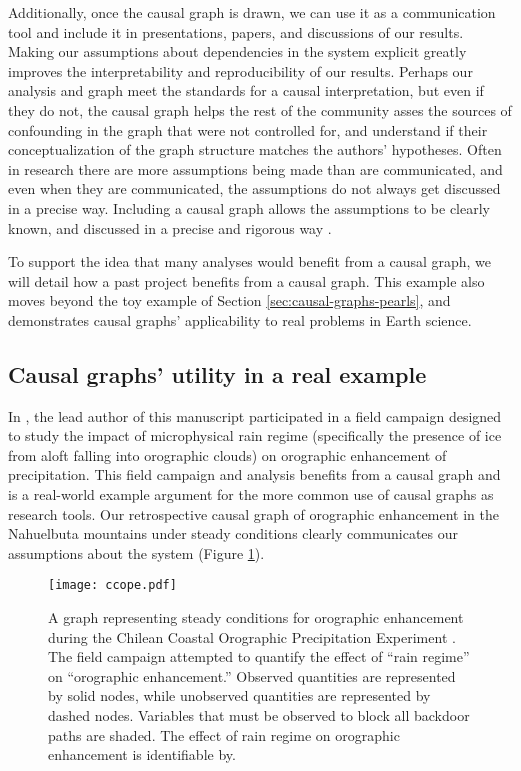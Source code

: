 \documentclass[12pt]{article}
\begin{document}
Additionally, once the causal graph is drawn, we can use it as a
communication tool and include it in presentations, papers, and
discussions of our results. Making our assumptions about dependencies
in the system explicit greatly improves the interpretability and
reproducibility of our results. Perhaps our analysis and graph meet
the standards for a causal interpretation, but even if they do not,
the causal graph helps the rest of the community asses the sources of
confounding in the graph that were not controlled for, and understand
if their conceptualization of the graph structure matches the authors'
hypotheses. Often in research there are more assumptions being made
than are communicated, and even when they are communicated, the
assumptions do not always get discussed in a precise way. Including a
causal graph allows the assumptions to be clearly known, and discussed
in a precise and rigorous way \citep[e.g.,][]{hannart-da}.

To support the idea that many analyses would benefit from a causal
graph, we will detail how a past project benefits from a causal
graph. This example also moves beyond the toy example of Section
\ref{sec:causal-graphs-pearls}, and demonstrates causal graphs'
applicability to real problems in Earth science.

\subsection{Causal graphs' utility in a real example}

In \citet{massmann2017}, the lead author of this manuscript
participated in a field campaign designed to study the impact of
microphysical rain regime (specifically the presence of ice from aloft
falling into orographic clouds) on orographic enhancement of
precipitation. This field campaign and analysis benefits from a causal
graph and is a real-world example argument for the more common use of
causal graphs as research tools. Our retrospective causal graph of
orographic enhancement in the Nahuelbuta mountains under steady
conditions clearly communicates our assumptions about the system
(Figure \ref{fig:ccope}).

\begin{figure} \texttt{[image: ccope.pdf]}
  \caption{A graph representing steady conditions for orographic
    enhancement during the Chilean Coastal Orographic Precipitation
    Experiment \citep[CCOPE,][]{massmann2017}. The field campaign
    attempted to quantify the effect of ``rain regime'' on
    ``orographic enhancement.''  Observed quantities are represented
    by solid nodes, while unobserved quantities are represented by
    dashed nodes. Variables that must be observed to block all
    backdoor paths are shaded. The effect of rain regime on orographic
    enhancement is identifiable by.}
  \label{fig:ccope}
\end{figure}
\end{document}
